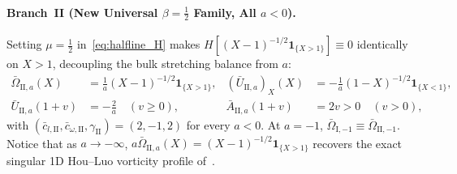 \documentclass[11pt,a4paper]{article}
\begin{document}
\paragraph{Branch~II (New Universal $\beta = \frac{1}{2}$ Family, All $a < 0$).}
Setting $\mu = \frac{1}{2}$ in~\eqref{eq:halfline_H} makes $H[(X-1)^{-1/2}\mathbf{1}_{\{X>1\}}] \equiv 0$ identically on $X > 1$, decoupling the bulk stretching balance from $a$:
\begin{align}
\bar\Omega_{\mathrm{II},a}(X) &= \frac{1}{a}(X-1)^{-1/2}\mathbf{1}_{\{X>1\}}, &
(\bar U_{\mathrm{II},a})_X(X) &= -\frac{1}{a}(1-X)^{-1/2}\mathbf{1}_{\{X<1\}}, \nonumber\\
\bar U_{\mathrm{II},a}(1+v) &= -\frac{2}{a} \quad (v \ge 0), &
\bar A_{\mathrm{II},a}(1+v) &= 2v > 0 \quad (v > 0), \label{eq:branch2_A}
\end{align}
with $(\bar c_{l,\mathrm{II}}, \bar c_{\omega,\mathrm{II}}, \gamma_{\mathrm{II}}) = (2, -1, 2)$ for every $a < 0$. At $a = -1$, $\bar\Omega_{\mathrm{I},-1} \equiv \bar\Omega_{\mathrm{II},-1}$. Notice that as $a \to -\infty$, $a\bar\Omega_{\mathrm{II},a}(X) = (X-1)^{-1/2}\mathbf{1}_{\{X>1\}}$ recovers the exact singular 1D Hou--Luo vorticity profile of~\cite{ChenHuangLi2026}.
\end{document}
